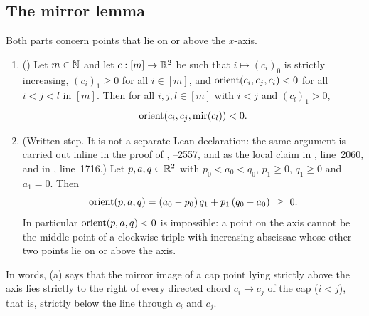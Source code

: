 \subsection{The mirror lemma}

\begin{lemma}\label{mm:lem:slope}
Both parts concern points that lie on or above the $x$-axis.
\begin{enumerate}[label=(\alph*)]
\item () Let $m\in\mathbb N$ and let $c:[m]\to\mathbb R^2$ be such that $i\mapsto(c_i)_0$ is
  strictly increasing, $(c_i)_1\ge0$ for all $i\in[m]$, and $\operatorname{orient}(c_i,c_j,c_l)<0$ for all $i<j<l$ in
  $[m]$. Then for all $i,j,l\in[m]$ with $i<j$ and $(c_l)_1>0$,
  \[ \operatorname{orient}(c_i,c_j,\operatorname{mir}(c_l))<0. \]
\item (Written step. It is not a separate Lean declaration: the same argument is carried out inline in
  the proof of , --2557, and as the
  local claim  in , line~2060, and in ,
  line~1716.) Let $p,a,q\in\mathbb R^2$ with $p_0<a_0<q_0$, $p_1\ge0$, $q_1\ge0$ and $a_1=0$. Then
  \[ \orient(p,a,q)=(a_0-p_0)\,q_1+p_1\,(q_0-a_0)\ \ge\ 0 . \]
  In particular $\operatorname{orient}(p,a,q)<0$ is impossible: a point on the axis cannot be the middle point of a
  clockwise triple with increasing abscissae whose other two points lie on or above the axis.
\end{enumerate}
\end{lemma}

In words, (a) says that the mirror image of a cap point lying strictly above the axis lies strictly to the
right of every directed chord $c_i\to c_j$ of the cap ($i<j$), that is, strictly below the line through
$c_i$ and $c_j$.

